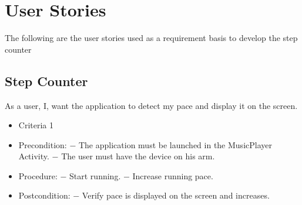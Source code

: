 \section{User Stories}
The following are the user stories used as a requirement basis to develop the step counter

\subsection{Step Counter}
{As a user, I, want the application to detect my pace and display it on the screen. }
{\begin{itemize}
\item Criteria 1
\end{itemize}}
{\begin{itemize}
\item Precondition: 
\subitem $-$ The application must be launched in the MusicPlayer Activity.
\subitem $-$ The user must have the device on his arm.

\item Procedure:
\subitem $-$ Start running.
\subitem $-$ Increase running pace.

\item Postcondition:
\subitem $-$ Verify pace is displayed on the screen and increases.
\end{itemize}}